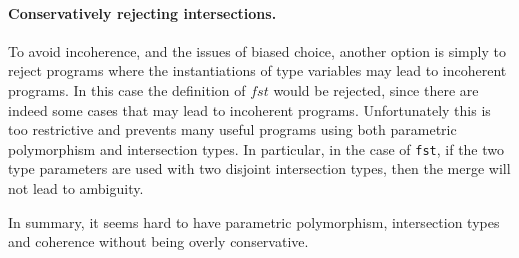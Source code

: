 \paragraph{Conservatively rejecting intersections.}
To avoid incoherence, and the issues of biased choice, another option
is simply to reject programs where the
instantiations of type variables may lead to incoherent programs.
In this case the definition of $fst$ would be rejected, since there
are indeed some cases that may lead to incoherent programs.
Unfortunately this is too restrictive and prevents many useful
programs using both parametric polymorphism and intersection types.
In particular, in the case of \lstinline{fst}, if the two type
parameters are used with two disjoint intersection
types, then the merge will not lead to ambiguity.

In summary, it seems hard to have parametric polymorphism, intersection
types and coherence without being overly conservative.


